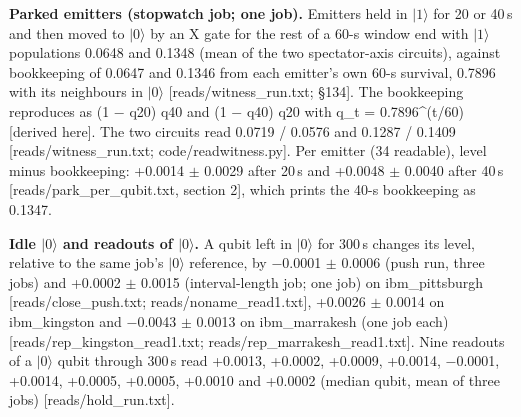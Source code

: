 \documentclass[11pt]{article}
\begin{document}
\par\smallskip\noindent{}\par\smallskip
\textbf{Parked emitters (stopwatch job; one job).} Emitters held in \(|1\rangle\) for 20 or 40\,\textmu s and then moved to \(|0\rangle\) by an X gate for the rest of a 60-\textmu s window end with \(|1\rangle\) populations 0.0648 and 0.1348 (mean of the two spectator-axis circuits), against bookkeeping of 0.0647 and 0.1346 from each emitter's own 60-\textmu s survival, 0.7896 with its neighbours in \(|0\rangle\) {[}reads/witness\_run.txt; \S{}134{]}. The bookkeeping reproduces as (1 \(-\) q20) q40 and (1 \(-\) q40) q20 with q\_t = 0.7896\^{}(t/60) {[}derived here{]}. The two circuits read 0.0719 / 0.0576 and 0.1287 / 0.1409 {[}reads/witness\_run.txt; code/readwitness.py{]}. Per emitter (34 readable), level minus bookkeeping: +0.0014 \(\pm\) 0.0029 after 20\,\textmu s and +0.0048 \(\pm\) 0.0040 after 40\,\textmu s {[}reads/park\_per\_qubit.txt, section 2{]}, which prints the 40-\textmu s bookkeeping as 0.1347.

\textbf{Idle \(|0\rangle\) and readouts of \(|0\rangle\).} A qubit left in \(|0\rangle\) for 300\,\textmu s changes its level, relative to the same job's \(|0\rangle\) reference, by \(-\)0.0001 \(\pm\) 0.0006 (push run, three jobs) and +0.0002 \(\pm\) 0.0015 (interval-length job; one job) on ibm\_pittsburgh {[}reads/close\_push.txt; reads/noname\_read1.txt{]}, +0.0026 \(\pm\) 0.0014 on ibm\_kingston and \(-\)0.0043 \(\pm\) 0.0013 on ibm\_marrakesh (one job each) {[}reads/rep\_kingston\_read1.txt; reads/rep\_marrakesh\_read1.txt{]}. Nine readouts of a \(|0\rangle\) qubit through 300\,\textmu s read +0.0013, +0.0002, +0.0009, +0.0014, \(-\)0.0001, +0.0014, +0.0005, +0.0005, +0.0010 and +0.0002 (median qubit, mean of three jobs) {[}reads/hold\_run.txt{]}.
\end{document}
